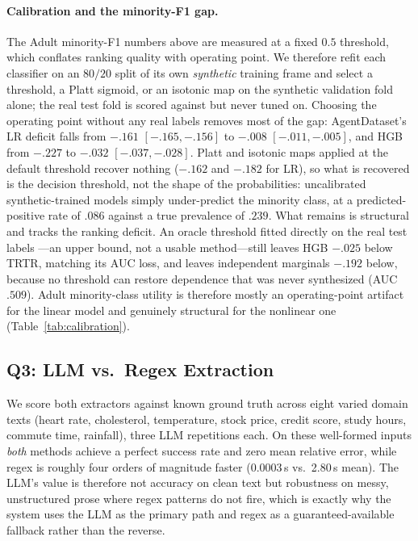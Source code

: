 \documentclass[letterpaper]{article} %
\begin{document}
\paragraph{Calibration and the minority-F1 gap.} The Adult minority-F1 numbers
above are measured at a fixed $0.5$ threshold, which conflates ranking quality
with operating point. We therefore refit each classifier on an $80/20$ split of
its own \emph{synthetic} training frame and select a threshold, a Platt sigmoid,
or an isotonic map on the synthetic validation fold alone; the real test fold is
scored against but never tuned on. Choosing the operating point without any real
labels removes most of the gap: AgentDataset's LR deficit falls from $-.161$
$[-.165,-.156]$ to $-.008$ $[-.011,-.005]$, and HGB from $-.227$ to $-.032$
$[-.037,-.028]$. Platt and isotonic maps applied at the default threshold recover
nothing ($-.162$ and $-.182$ for LR), so what is recovered is the decision
threshold, not the shape of the probabilities: uncalibrated synthetic-trained
models simply under-predict the minority class, at a predicted-positive rate of
$.086$ against a true prevalence of $.239$. What remains is structural and tracks
the ranking deficit. An oracle threshold fitted directly on the real test labels
---an upper bound, not a usable method---still leaves HGB $-.025$ below TRTR,
matching its AUC loss, and leaves independent marginals $-.192$ below, because no
threshold can restore dependence that was never synthesized (AUC $.509$). Adult
minority-class utility is therefore mostly an operating-point artifact for the
linear model and genuinely structural for the nonlinear one
(Table~\ref{tab:calibration}).

\subsection{Q3: LLM vs.\ Regex Extraction}
We score both extractors against known ground truth across eight varied domain
texts (heart rate, cholesterol, temperature, stock price, credit score, study
hours, commute time, rainfall), three LLM repetitions each. On these
well-formed inputs \emph{both} methods achieve a perfect success rate and zero
mean relative error, while regex is roughly four orders of magnitude faster
(0.0003\,s vs.\ 2.80\,s mean). The LLM's value is therefore not accuracy on
clean text but robustness on messy, unstructured prose where regex patterns do
not fire, which is exactly why the system uses the LLM as the primary path
and regex as a guaranteed-available fallback rather than the reverse.
\end{document}
